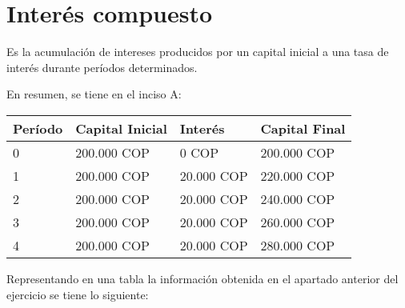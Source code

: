 \section{Interés compuesto}
Es la acumulación de intereses producidos por un capital inicial a una tasa de interés durante períodos determinados.\\



\clearpage

En resumen, se tiene en el inciso A:
\begin{table}[htbp]
   \begin{center}
      \begin{tabular}{|l|l|l|l|}
         \hline
         Período & Capital Inicial & Interés     & Capital Final \\
         \hline
         0       & 200.000 COP &  0 COP      & 200.000 COP  \\ \hline
         1       & 200.000 COP &  20.000 COP & 220.000 COP  \\ \hline
         2       & 200.000 COP &  20.000 COP & 240.000 COP  \\ \hline
         3       & 200.000 COP &  20.000 COP & 260.000 COP  \\ \hline
         4       & 200.000 COP &  20.000 COP & 280.000 COP  \\ \hline
      \end{tabular}
      \label{tabla:interesSimple1}
   \end{center}
\end{table}



Representando en una tabla la información obtenida en el apartado anterior del ejercicio se tiene lo siguiente:\\

